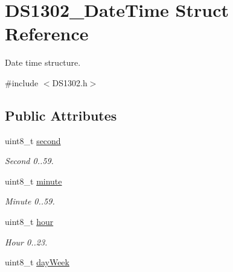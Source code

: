 \hypertarget{struct_d_s1302___date_time}{}\section{D\+S1302\+\_\+\+Date\+Time Struct Reference}
\label{struct_d_s1302___date_time}


Date time structure.  




{\ttfamily \#include $<$D\+S1302.\+h$>$}

\subsection*{Public Attributes}
\begin{DoxyCompactItemize}
\item 
uint8\+\_\+t \hyperlink{struct_d_s1302___date_time_a13577ffb4c390f4873bea7d58eef10e8}{second}\hypertarget{struct_d_s1302___date_time_a13577ffb4c390f4873bea7d58eef10e8}{}\label{struct_d_s1302___date_time_a13577ffb4c390f4873bea7d58eef10e8}

\begin{DoxyCompactList}\small\item\em Second 0..59. \end{DoxyCompactList}\item 
uint8\+\_\+t \hyperlink{struct_d_s1302___date_time_a53dd5392759b2355ed7056b64babe9d8}{minute}\hypertarget{struct_d_s1302___date_time_a53dd5392759b2355ed7056b64babe9d8}{}\label{struct_d_s1302___date_time_a53dd5392759b2355ed7056b64babe9d8}

\begin{DoxyCompactList}\small\item\em Minute 0..59. \end{DoxyCompactList}\item 
uint8\+\_\+t \hyperlink{struct_d_s1302___date_time_aea287766c87d50712a3e87c6c11955a8}{hour}\hypertarget{struct_d_s1302___date_time_aea287766c87d50712a3e87c6c11955a8}{}\label{struct_d_s1302___date_time_aea287766c87d50712a3e87c6c11955a8}

\begin{DoxyCompactList}\small\item\em Hour 0..23. \end{DoxyCompactList}\item 
uint8\+\_\+t \hyperlink{struct_d_s1302___date_time_a6a808f7780570d6684dba47e1d043358}{day\+Week}\hypertarget{struct_d_s1302___date_time_a6a808f7780570d6684dba47e1d043358}{}\label{struct_d_s1302___date_time_a6a808f7780570d6684dba47e1d043358}


\end{DoxyCompactItemize}

